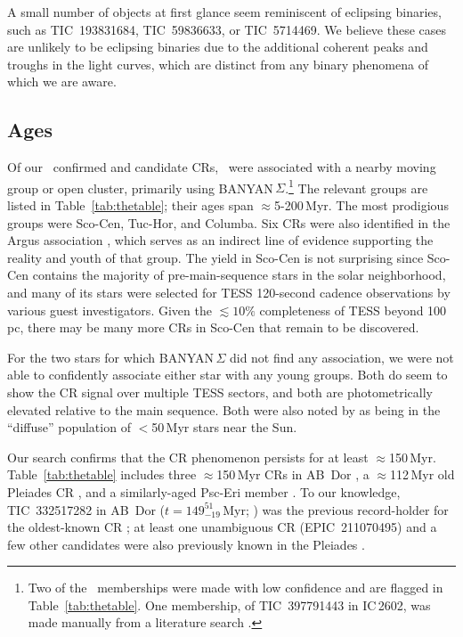 \documentclass[11pt,twocolumn,tighten]{aastex63}
\begin{document}
A small number of objects at first glance seem reminiscent of
eclipsing binaries, such as TIC~193831684, TIC~59836633, or
TIC~5714469.  We believe these cases are unlikely to be eclipsing
binaries due to the additional coherent peaks and troughs in the light
curves, which are distinct from any binary phenomena of which we are
aware.



\subsection{Ages}

Of our \ncqvsnodebunked\ confirmed and candidate CRs,
\nnotfieldbanyan\ were associated with a nearby moving group or open
cluster, primarily using BANYAN\,$\Sigma$.\footnote{Two of the
\nnotfieldbanyan\ memberships were made with low confidence and are
flagged in Table~\ref{tab:thetable}.  One membership, of TIC~397791443
in IC\,2602, was made manually from a literature search
\citep[e.g.][]{2020A&A...633A..99C}.}  The relevant groups are listed
in Table~\ref{tab:thetable}; their ages span $\approx$5-200\,Myr.  The
most prodigious groups were Sco-Cen, Tuc-Hor, and Columba.  Six CRs
were also identified in the Argus association
\citep{2019ApJ...870...27Z}, which serves as an indirect line of
evidence supporting the reality and youth of that group.  The yield in
Sco-Cen is not surprising since Sco-Cen contains the majority of
pre-main-sequence stars in the solar neighborhood, and many of its
stars were selected for TESS 120-second cadence observations by
various guest investigators.  Given the $\lesssim$$10\%$ completeness
of TESS beyond 100\,pc, there may be many more CRs in Sco-Cen that
remain to be discovered.  

For the two stars for which BANYAN\,$\Sigma$ did not find any
association, we were not able to confidently associate either star
with any young groups.  Both do seem to show the CR signal over
multiple TESS sectors, and both are photometrically elevated relative
to the main sequence.  Both were also noted by
\citet{2021ApJ...917...23K} as being in the ``diffuse'' population of
$<$50\,Myr stars near the Sun.

Our search confirms that the CR phenomenon persists for at least
$\approx$150\,Myr.  Table~\ref{tab:thetable} includes three
$\approx$150\,Myr CRs in AB~Dor \citep{2015MNRAS.454..593B}, a
$\approx$112\,Myr old Pleiades CR \citep{2015ApJ...813..108D}, and a
similarly-aged Psc-Eri member \citep{2020A&A...639A..64R}.  To our
knowledge, TIC~332517282 in AB~Dor ($t$$=$$149^{51}_{-19}$\,Myr;
\citealt{2015MNRAS.454..593B}) was the previous record-holder for the
oldest-known CR \citep{2019ApJ...876..127Z,2022AJ....163..144G}; at
least one unambiguous CR (EPIC~211070495) and a few other candidates
were also previously known in the Pleiades
\citep{2016AJ....152..114R}.  
\end{document}
